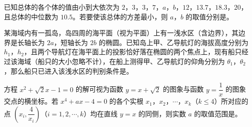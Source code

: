 \begin{question}
已知总体的各个体的值由小到大依次为 $2$，$3$，$3$，$7$，$a$，$b$，$12$，$13.7$，$18.3$，$20$，且总体的中位数为 $10.5$。若要使该总体的方差最小，则 $a$，$b$ 的取值分别是\gkblank{}。

\end{question}
\begin{question}
某海域内有一孤岛，岛四周的海平面（视为平面）上有一浅水区（含边界），其边界是长轴长为 $2a$，短轴长为 $2b$ 的椭圆。已知岛上甲、乙导航灯的海拔高度分别为 $h_1$，$h_2$，且两个导航灯在海平面上的投影恰好落在椭圆的两个焦点上，现有船只经过该海域（船只的大小忽略不计），在船上测得甲、乙导航灯的仰角分别为 $\theta_1$，$\theta_2$，那么船只已进入该浅水区的判别条件是\gkblank{}。

\end{question}
\begin{question}
方程 $x^2+\sqrt2x-1=0$ 的解可视为函数 $y=x+\sqrt2$ 的图象与函数 $y=\dfrac1x$ 的图象交点的横坐标。若 $x^4+ax-4=0$ 的各个实根 $x_1$，$x_2$，$\cdots$，$x_k$（$k\leqslant4$）所对应的点 $\left(x_i,\dfrac4{x_i}\right)$（$i=1,2,\cdots,k$）均在直线 $y=x$ 的同侧，则实数 $a$ 的取值范围是\gkblank{}。

\end{question}

